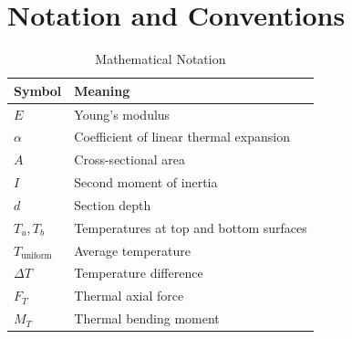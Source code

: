 \documentclass[12pt,a4paper]{article}
\begin{document}
\section{Notation and Conventions}

\begin{table}[H]
    \centering
    \caption{Mathematical Notation}
    \label{tab:notation}
    \begin{tabular}{ll}
        \toprule
        \textbf{Symbol} & \textbf{Meaning} \\
        \midrule
        $E$ & Young's modulus \\
        $\alpha$ & Coefficient of linear thermal expansion \\
        $A$ & Cross-sectional area \\
        $I$ & Second moment of inertia \\
        $d$ & Section depth \\
        $T_u, T_b$ & Temperatures at top and bottom surfaces \\
        $T_{\text{uniform}}$ & Average temperature \\
        $\Delta T$ & Temperature difference \\
        $F_T$ & Thermal axial force \\
        $M_T$ & Thermal bending moment \\
        \bottomrule
    \end{tabular}
\end{table}
\end{document}

